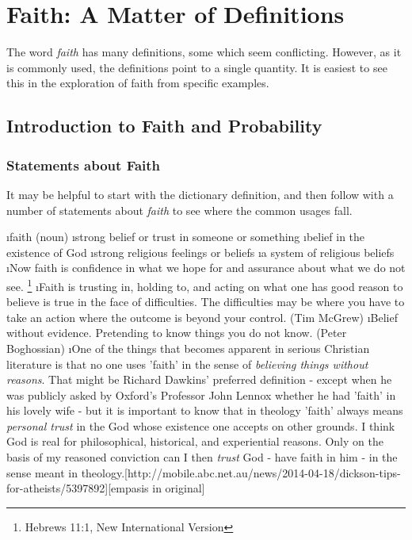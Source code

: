 \chapter{Faith: A Matter of Definitions}\label{ch:faith}

The word {\em faith} has many definitions, some which seem conflicting.  However, as it is commonly used, the definitions point to a single quantity.  It is easiest to see this in the exploration of faith from specific examples.

\section{Introduction to Faith and Probability}

\subsection{Statements about Faith}

It may be helpful to start with the dictionary definition, and then follow with a number of statements about {\em faith} to see where the common usages fall.

\bi
\i faith (noun)\cite{MerriamWebster2009}
    \bi
    \i strong belief or trust in someone or something
    \i belief in the existence of God
    \i strong religious feelings or beliefs
    \i a system of religious beliefs
    \ei
\i Now faith is confidence in what we hope for and assurance about what we do not see. \footnote{Hebrews 11:1, New International Version}
\i Faith is trusting in, holding to, and acting on what one has
good reason to believe is true in the face of difficulties. The
difficulties may be where you have to take an action where the outcome
is beyond your control. (Tim McGrew)\cite{Brierley:2014aa}
\i Belief without evidence.  Pretending to know things you do not know. (Peter Boghossian)\cite{Brierley:2014aa}
\i One of the things that becomes apparent in serious Christian literature is that no one uses 'faith' in the sense of {\em believing things without reasons}. That might be Richard Dawkins' preferred definition - except when he was publicly asked by Oxford's Professor John Lennox whether he had 'faith' in his lovely wife - but it is important to know that in theology 'faith' always means {\em personal trust} in the God whose existence one accepts on other grounds. I think God is real for philosophical, historical, and experiential reasons. Only on the basis of my reasoned conviction can I then {\em trust} God - have faith in him - in the sense meant in theology.[http://mobile.abc.net.au/news/2014-04-18/dickson-tips-for-atheists/5397892][empasis in original]
\ei

